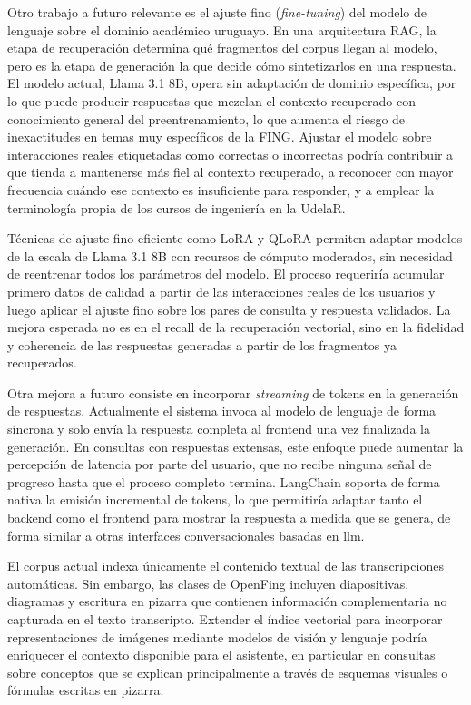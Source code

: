 Otro trabajo a futuro relevante es el ajuste fino (\textit{fine-tuning}) del modelo de lenguaje sobre el dominio académico uruguayo. En una arquitectura RAG, la etapa de recuperación determina qué fragmentos del corpus llegan al modelo, pero es la etapa de generación la que decide cómo sintetizarlos en una respuesta. El modelo actual, Llama 3.1 8B, opera sin adaptación de dominio específica, por lo que puede producir respuestas que mezclan el contexto recuperado con conocimiento general del preentrenamiento, lo que aumenta el riesgo de inexactitudes en temas muy específicos de la FING. Ajustar el modelo sobre interacciones reales etiquetadas como correctas o incorrectas podría contribuir a que tienda a mantenerse más fiel al contexto recuperado, a reconocer con mayor frecuencia cuándo ese contexto es insuficiente para responder, y a emplear la terminología propia de los cursos de ingeniería en la UdelaR.

Técnicas de ajuste fino eficiente como LoRA \cite{hu2022lora} y QLoRA \cite{dettmers2023qlora} permiten adaptar modelos de la escala de Llama 3.1 8B con recursos de cómputo moderados, sin necesidad de reentrenar todos los parámetros del modelo. El proceso requeriría acumular primero datos de calidad a partir de las interacciones reales de los usuarios y luego aplicar el ajuste fino sobre los pares de consulta y respuesta validados. La mejora esperada no es en el recall de la recuperación vectorial, sino en la fidelidad y coherencia de las respuestas generadas a partir de los fragmentos ya recuperados.

Otra mejora a futuro consiste en incorporar \textit{streaming} de tokens en la generación de respuestas. Actualmente el sistema invoca al modelo de lenguaje de forma síncrona y solo envía la respuesta completa al \gls{frontend} una vez finalizada la generación. En consultas con respuestas extensas, este enfoque puede aumentar la percepción de latencia por parte del usuario, que no recibe ninguna señal de progreso hasta que el proceso completo termina. LangChain soporta de forma nativa la emisión incremental de tokens, lo que permitiría adaptar tanto el \gls{backend} como el \gls{frontend} para mostrar la respuesta a medida que se genera, de forma similar a otras interfaces conversacionales basadas en \acrshort{llm}.

El corpus actual indexa únicamente el contenido textual de las transcripciones automáticas. Sin embargo, las clases de OpenFing incluyen diapositivas, diagramas y escritura en pizarra que contienen información complementaria no capturada en el texto transcripto. Extender el índice vectorial para incorporar representaciones de imágenes mediante modelos de visión y lenguaje podría enriquecer el contexto disponible para el asistente, en particular en consultas sobre conceptos que se explican principalmente a través de esquemas visuales o fórmulas escritas en pizarra.


